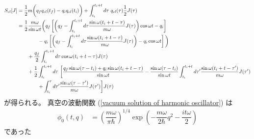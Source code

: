 \begin{align}
    S_{cl} [J]
    &=
    \frac{1}{2} m
    \bigg(
        q_f
        \dot{q}_{cl}(t_f)
    -
        q_i
        \dot{q}_{cl}(t_i)
    \bigg)
    +
    \int_{t_i}^{t_i + t} d\tau\ 
        q_{cl}(\tau)
        \frac{1}{2}
        J(\tau)
\notag\\&
    =
    \frac{1}{2}
    \frac{ m \omega }{ \sin \omega t }
    \bigg(
        q_f
        \left[
            \left(
                q_f
            -
                \int_{t_i}^{t_i + t} d\tau
                \frac{ \sin \omega (t_i + t - \tau) }{m\omega}
                J(\tau)
            \right)
            \cos \omega t
        -
            q_i
        \right]
\notag\\&\qquad\qquad
    -
        q_i
        \left[
            \left(
                q_f
            -
                \int_{t_i}^{t_i + t} d\tau
                \frac{ \sin \omega (t_i + t - \tau) }{m\omega}
                J(\tau)
            \right)
        -
            q_i \cos \omega t
        \right]
    \bigg)
\notag\\&\qquad
    +
        \frac{q_f}{2}
        \int_{t_i}^{t_i + t} d\tau
        \cos \omega (t_i + t - \tau)
        J(\tau)
\notag\\&\qquad
    +
    \frac{1}{2}
    \int_{t_i}^{t_i + t} d\tau\ 
    \bigg[
        \frac{
            q_f \sin \omega (\tau - t_i)
        +
            q_i \sin \omega (t_i + t - \tau)
        }{ \sin \omega t }
    -
        \frac{ \sin \omega (\tau - t_i) }{
            \sin \omega t
        }
        \int_{t_i}^{t_i + t} d\tau'
        \frac{ \sin \omega (t_i + t - \tau') }{m\omega}
        J(\tau')
\notag\\&\qquad\qquad
    +
        \int_{t_i}^\tau d\tau'
        \frac{ \sin \omega (\tau - \tau')}{m\omega}
        J(\tau')
    \bigg]
    J(\tau)
\end{align}
が得られる。
真空の波動関数
(\ref{vacuum solution of harmonic oscillator})
は
\begin{align}
    \phi_0  (t, q)
    &=
    \left(
        \dfrac{m \omega}{\pi \hbar}        
    \right)^{1/4}
    \exp(
        - \dfrac{m \omega}{2 \hbar} q^2
        -
        \dfrac{i t \omega}{2}
    )
\end{align}
であった
